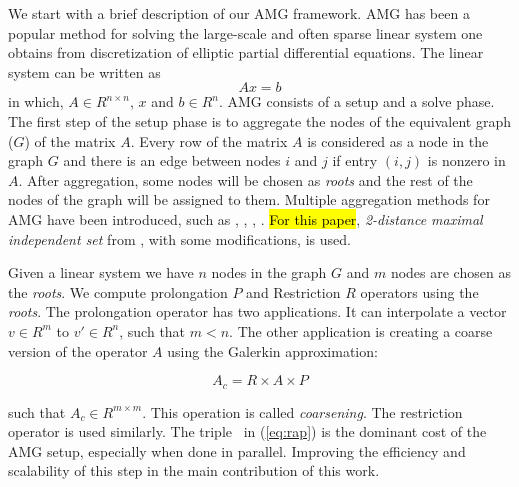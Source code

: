 We start with a brief description of our AMG framework. 
AMG has been a popular method for solving the large-scale and 
often sparse linear system one obtains from discretization of elliptic partial 
differential equations.  The linear system can be written as
\begin{equation}
 Ax = b
\end{equation}
\noindent in which, $A \in R^{n \times n}$, $x$ and $b \in R^{n}$.
AMG consists of a setup and a solve phase.
The first step of the setup phase is to aggregate the nodes of the equivalent 
graph ($G$) of the matrix $A$. Every row of the matrix $A$ is considered as a node
in the graph $G$ and there is an edge between nodes $i$ and $j$ if entry $(i,j)$ is nonzero in $A$.
After aggregation, %
some nodes will be chosen as \textit{roots} and the
rest of the nodes of the graph will be assigned to them.
Multiple aggregation methods for AMG have been introduced, such as
\cite{bell2012exposing}, \cite{notay2010aggregation},
\cite{Guillard98anaggregation}, %
\cite{DBLP:journals/siammax/Notay06}. %
\hl{For this paper}, \textit{2-distance maximal independent set} from \cite{bell2012exposing}, with some modifications, is used. 

Given a linear system we have $n$ 
nodes in the graph $G$ and $m$ nodes are chosen as the \textit{roots}.
We compute prolongation $P$ and Restriction $R$ operators using the \textit{roots}. 
The prolongation operator has two applications. It can interpolate a vector $v \in R^m$ to $v' \in R^n$, such that $m < n$.
The other application is creating a coarse version of the operator $A$ using the Galerkin approximation:

\begin{equation}
  \label{eq:rap}
 A_c = R \times A \times P
\end{equation}

\noindent such that $A_c \in R^{m \times m}$. This operation is called \textit{coarsening}.
The restriction operator is used similarly. The triple \mm\ in (\ref{eq:rap}) is the dominant cost of the AMG setup, especially when done in parallel. Improving the efficiency and scalability of this step in the main contribution of this work. 

